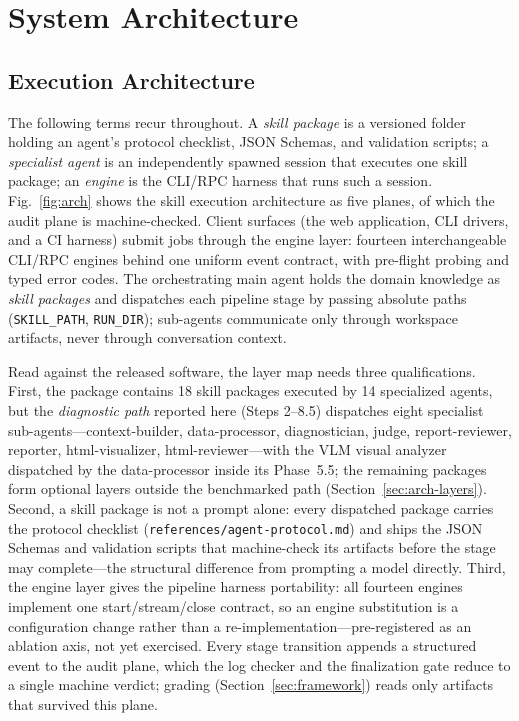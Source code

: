 \documentclass[preprint,12pt]{elsarticle}
\begin{document}
\section{System Architecture}
\label{sec:arch}

\subsection{Execution Architecture}
The following terms recur throughout. A \emph{skill package} is a versioned folder holding an agent's protocol checklist, JSON Schemas, and validation scripts; a \emph{specialist agent} is an independently spawned session that executes one skill package; an \emph{engine} is the CLI/RPC harness that runs such a session. Fig.~\ref{fig:arch} shows the skill execution architecture as five planes, of which the audit plane is machine-checked. Client surfaces (the web application, CLI drivers, and a CI harness) submit jobs through the engine layer: fourteen interchangeable CLI/RPC engines behind one uniform event contract, with pre-flight probing and typed error codes. The orchestrating main agent holds the domain knowledge as \emph{skill packages} and dispatches each pipeline stage by passing absolute paths (\texttt{SKILL\_PATH}, \texttt{RUN\_DIR}); sub-agents communicate only through workspace artifacts, never through conversation context.

Read against the released software, the layer map needs three qualifications. First, the package contains 18 skill packages executed by 14 specialized agents, but the \emph{diagnostic path} reported here (Steps 2--8.5) dispatches eight specialist sub-agents---context-builder, data-processor, diagnostician, judge, report-reviewer, reporter, html-visualizer, html-reviewer---with the VLM visual analyzer dispatched by the data-processor inside its Phase~5.5; the remaining packages form optional layers outside the benchmarked path (Section~\ref{sec:arch-layers}). Second, a skill package is not a prompt alone: every dispatched package carries the protocol checklist (\texttt{references/agent-protocol.md}) and ships the JSON Schemas and validation scripts that machine-check its artifacts before the stage may complete---the structural difference from prompting a model directly. Third, the engine layer gives the pipeline harness portability: all fourteen engines implement one start/stream/close contract, so an engine substitution is a configuration change rather than a re-implementation---pre-registered as an ablation axis, not yet exercised. Every stage transition appends a structured event to the audit plane, which the log checker and the finalization gate reduce to a single machine verdict; grading (Section~\ref{sec:framework}) reads only artifacts that survived this plane.
\end{document}
